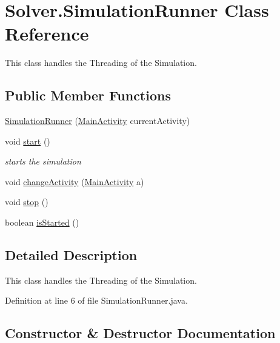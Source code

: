 \hypertarget{classSolver_1_1SimulationRunner}{}\section{Solver.\+Simulation\+Runner Class Reference}
\label{classSolver_1_1SimulationRunner}


This class handles the Threading of the Simulation.  


\subsection*{Public Member Functions}
\begin{DoxyCompactItemize}
\item 
\hyperlink{classSolver_1_1SimulationRunner_a58f6020d625c60b8a04329eced280ca9}{Simulation\+Runner} (\hyperlink{classInterface_1_1MainActivity}{Main\+Activity} current\+Activity)
\item 
void \hyperlink{classSolver_1_1SimulationRunner_ab34c984e38253223884911c042175426}{start} ()
\begin{DoxyCompactList}\small\item\em starts the simulation \end{DoxyCompactList}\item 
void \hyperlink{classSolver_1_1SimulationRunner_ab44a9a2edd9aec16fe26bb05fa0f1115}{change\+Activity} (\hyperlink{classInterface_1_1MainActivity}{Main\+Activity} a)
\item 
void \hyperlink{classSolver_1_1SimulationRunner_a9b9b7707ac2d73e32cc86d3d0a609dde}{stop} ()
\item 
boolean \hyperlink{classSolver_1_1SimulationRunner_a6b7b251488a9854ee2221e3fd37e4c26}{is\+Started} ()
\end{DoxyCompactItemize}


\subsection{Detailed Description}
This class handles the Threading of the Simulation. 

Definition at line 6 of file Simulation\+Runner.\+java.



\subsection{Constructor \& Destructor Documentation}
